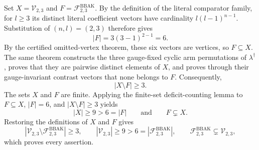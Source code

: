 Set \(X=\mathcal V_{2,3}\) and \(F=\mathcal F^{\mathrm{BBAK}}_{2,3}\). By the definition of the literal comparator family, for \(l\ge 3\) its distinct literal coefficient vectors have cardinality \(l(l-1)^{n-1}\). Substitution of \((n,l)=(2,3)\) therefore gives
\[|F|=3(3-1)^{2-1}=6.\]
By the certified omitted-vertex theorem, these six vectors are vertices, so \(F\subseteq X\). The same theorem constructs the three gauge-fixed cyclic arm permutations of \(\lambda^\dagger\), proves that they are pairwise distinct elements of \(X\), and proves through their gauge-invariant contrast vectors that none belongs to \(F\). Consequently,
\[|X\setminus F|\ge 3.\]
The sets \(X\) and \(F\) are finite. Applying the finite-set deficit-counting lemma to \(F\subseteq X\), \(|F|=6\), and \(|X\setminus F|\ge3\) yields
\[|X|\ge9>6=|F|\qquad\text{and}\qquad F\subsetneq X.\]
Restoring the definitions of \(X\) and \(F\) gives
\[|\mathcal V_{2,3}\setminus\mathcal F^{\mathrm{BBAK}}_{2,3}|\ge3,\qquad |\mathcal V_{2,3}|\ge9>6=|\mathcal F^{\mathrm{BBAK}}_{2,3}|,\qquad \mathcal F^{\mathrm{BBAK}}_{2,3}\subsetneq\mathcal V_{2,3},\]
which proves every assertion.